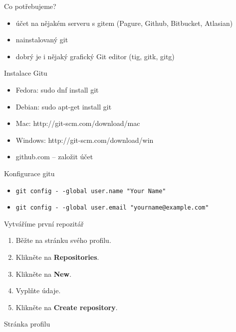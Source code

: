 \documentclass[14pt]{beamer}
\renewcommand{\texttt}[1]{{{\tt\color{blue}#1}}}
\begin{document}
\begin{frame}{Co potřebujeme?}
	\begin{itemize}
		\item účet na nějakém serveru s gitem (Pagure, Github, Bitbucket, Atlasian)
		\item nainstalovaný git
		\item dobrý je i nějaký grafický Git editor (tig, gitk, gitg)
	\end{itemize}
\end{frame}

	\begin{frame}{Instalace Gitu}
		\begin{itemize}
		\item Fedora: sudo dnf install git
		\item Debian: sudo apt-get install git
		\item Mac: http://git-scm.com/download/mac
		\item Windows: http://git-scm.com/download/win
		\item github.com -- založit účet
		\end{itemize}
	\end{frame}

	\begin{frame}{Konfigurace gitu}
		\begin{itemize}
		\item \texttt{git config -\,-global user.name "Your Name"}
		\item \texttt{git config -\,-global user.email "yourname@example.com"}
		\end{itemize}
	\end{frame}

	\begin{frame}{Vytváříme první repozitář}
		\begin{enumerate}
		\item Běžte na stránku svého profilu.
		\item Klikněte na \textbf{Repositories}.
		\item Klikněte na \textbf{New}.
		\item Vyplňte údaje.
		\item Klikněte na \textbf{Create repository}.
		\end{enumerate}
	\end{frame}

	\begin{frame}{Stránka profilu}
        \begin{center}
        \end{center}
	\end{frame}
\end{document}

